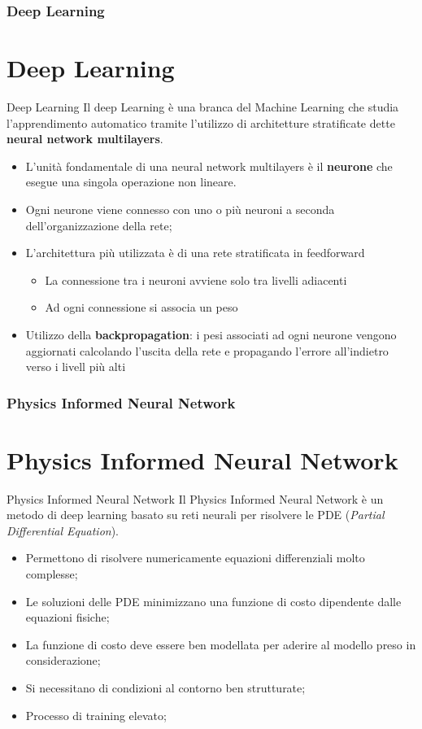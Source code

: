 \documentclass{beamer}
\begin{document}
\begin{frame}
	\frametitle{Deep Learning}
	\section{Deep Learning}
	\begin{block}{Deep Learning}
		Il deep Learning è una branca del Machine Learning che studia l'apprendimento automatico tramite l'utilizzo di architetture stratificate dette \textbf{neural  network multilayers}.
	\end{block}
	\begin{itemize}
		\item L'unità fondamentale di una neural network multilayers è il \textbf{neurone} che esegue una singola operazione non lineare.
		\item Ogni neurone viene connesso con uno o più neuroni a seconda dell'organizzazione della rete;
		\item L'architettura più utilizzata è di una rete stratificata in feedforward\begin{itemize}
			\item La connessione tra i neuroni avviene solo tra livelli adiacenti
			\item Ad ogni connessione si associa un peso
		\end{itemize}
		\item Utilizzo della \textbf{backpropagation}: i pesi associati ad ogni neurone vengono aggiornati calcolando l'uscita della rete e propagando l'errore all'indietro verso i livell più alti
	\end{itemize}
\end{frame}
\begin{frame}
	\frametitle{Physics Informed Neural Network}
	\section{Physics Informed Neural Network}
	\begin{block}{Physics Informed Neural Network}
		Il Physics Informed Neural Network è un metodo di deep learning basato su reti neurali per risolvere le PDE (\emph{Partial Differential Equation}).
	\end{block}
	\begin{itemize}
		\item Permettono di risolvere numericamente equazioni differenziali molto complesse;
		\item Le soluzioni delle PDE minimizzano una funzione di costo dipendente dalle equazioni fisiche;
		\item La funzione di costo deve essere ben modellata per aderire al modello preso in considerazione;
		\item Si necessitano di condizioni al contorno ben strutturate;
		\item Processo di training elevato;
	\end{itemize}
\end{frame}
\end{document}
